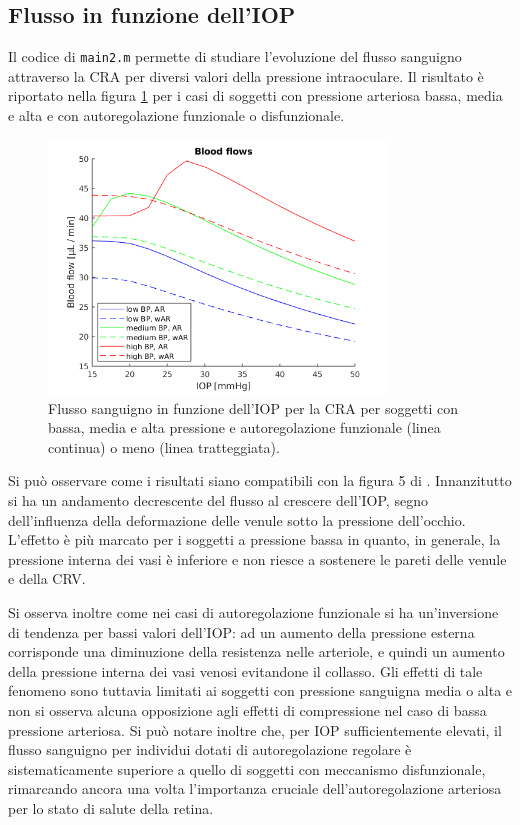\documentclass{article}
\begin{document}
\subsection{Flusso in funzione dell'IOP}
Il codice di \texttt{main2.m} permette di studiare l'evoluzione del flusso sanguigno attraverso la CRA per diversi valori della pressione intraoculare.
Il risultato è riportato nella figura \ref{fluxiop} per i casi di soggetti con pressione arteriosa bassa, media e alta e con autoregolazione funzionale o disfunzionale.

\begin{figure}[h]
\begin{center}
\includegraphics[width=0.8\textwidth]{Pictures/bf_iop.png}
\caption{Flusso sanguigno in funzione dell'IOP per la CRA per soggetti con bassa, media e alta pressione e autoregolazione funzionale (linea continua) o meno (linea tratteggiata).}
\label{fluxiop}
\end{center}
\end{figure}

Si può osservare come i risultati siano compatibili con la figura 5 di \citep{art1}.
Innanzitutto si ha un andamento decrescente del flusso al crescere dell'IOP, segno dell'influenza della deformazione delle venule sotto la pressione dell'occhio.
L'effetto è più marcato per i soggetti a pressione bassa in quanto, in generale, la pressione interna dei vasi è inferiore e non riesce a sostenere le pareti delle venule e della CRV.

Si osserva inoltre come nei casi di autoregolazione funzionale si ha un'inversione di tendenza per bassi valori dell'IOP: ad un aumento della pressione esterna corrisponde una diminuzione della resistenza nelle arteriole, e quindi un aumento della pressione interna dei vasi venosi evitandone il collasso.
Gli effetti di tale fenomeno sono tuttavia limitati ai soggetti con pressione sanguigna media o alta e non si osserva alcuna opposizione agli effetti di compressione nel caso di bassa pressione arteriosa.
Si può notare inoltre che, per IOP sufficientemente elevati, il flusso sanguigno per individui dotati di autoregolazione regolare è sistematicamente superiore a quello di soggetti con meccanismo disfunzionale, rimarcando ancora una volta l'importanza cruciale dell'autoregolazione arteriosa per lo stato di salute della retina.
\end{document}
